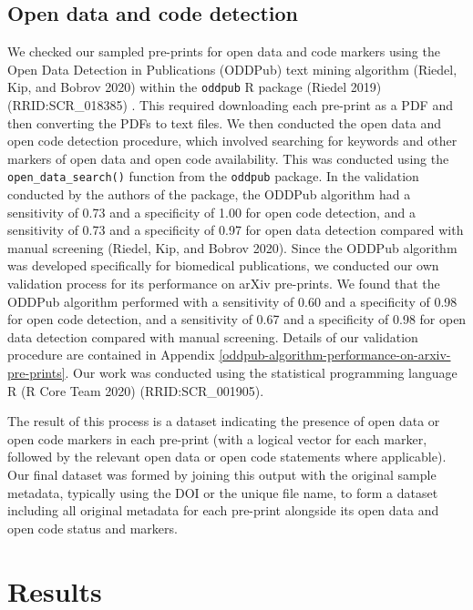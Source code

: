 \documentclass[
]{article}
\begin{document}
\hypertarget{open-data-and-code-detection}{%
\subsection{Open data and code detection}\label{open-data-and-code-detection}}

We checked our sampled pre-prints for open data and code markers using the Open Data Detection in Publications (ODDPub) text mining algorithm (Riedel, Kip, and Bobrov 2020) within the \texttt{oddpub} R package (Riedel 2019) (RRID:SCR\_018385) . This required downloading each pre-print as a PDF and then converting the PDFs to text files.
We then conducted the open data and open code detection procedure, which involved searching for keywords and other markers of open data and open code availability. This was conducted using the \texttt{open\_data\_search()} function from the \texttt{oddpub} package. In the validation conducted by the authors of the package, the ODDPub algorithm had a sensitivity of 0.73 and a specificity of 1.00 for open code detection, and a sensitivity of 0.73 and a specificity of 0.97 for open data detection compared with manual screening (Riedel, Kip, and Bobrov 2020). Since the ODDPub algorithm was developed specifically for biomedical publications, we conducted our own validation process for its performance on arXiv pre-prints. We found that the ODDPub algorithm performed with a sensitivity of 0.60 and a specificity of 0.98 for open code detection, and a sensitivity of 0.67 and a specificity of 0.98 for open data detection compared with manual screening. Details of our validation procedure are contained in Appendix \ref{oddpub-algorithm-performance-on-arxiv-pre-prints}. Our work was conducted using the statistical programming language R (R Core Team 2020) (RRID:SCR\_001905).

The result of this process is a dataset indicating the presence of open data or open code markers in each pre-print (with a logical vector for each marker, followed by the relevant open data or open code statements where applicable). Our final dataset was formed by joining this output with the original sample metadata, typically using the DOI or the unique file name, to form a dataset including all original metadata for each pre-print alongside its open data and open code status and markers.

\hypertarget{results}{%
\section{Results}\label{results}}
\end{document}
